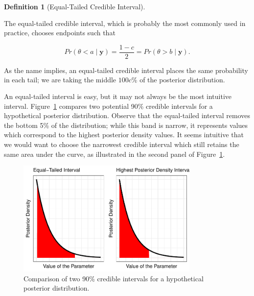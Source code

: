 \documentclass[
  letterpaper,
  DIV=11,
  numbers=noendperiod]{scrreprt}
\theoremstyle{definition}
\newtheorem{definition}{Definition}[chapter]
\theoremstyle{plain}
\theoremstyle{definition}
\theoremstyle{remark}
\begin{document}
\begin{definition}[Equal-Tailed Credible
Interval]\protect\hypertarget{def-equal-tail-interval}{}\label{def-equal-tail-interval}

The equal-tailed credible interval, which is probably the most commonly
used in practice, chooses endpoints such that

\[Pr(\theta < a \mid \mathbf{y}) = \frac{1-c}{2} = Pr(\theta > b \mid \mathbf{y}).\]

\end{definition}

As the name implies, an equal-tailed credible interval places the same
probability in each tail; we are taking the middle \(100c\)\% of the
posterior distribution.

An equal-tailed interval is easy, but it may not always be the most
intuitive interval.
Figure~\ref{fig-interval-estimation-compare-intervals} compares two
potential 90\% credible intervals for a hypothetical posterior
distribution. Observe that the equal-tailed interval removes the bottom
5\% of the distribution; while this band is narrow, it represents values
which correspond to the highest posterior density values. It seems
intuitive that we would want to choose the narrowest credible interval
which still retains the same area under the curve, as illustrated in the
second panel of Figure~\ref{fig-interval-estimation-compare-intervals}.

\begin{figure}

{\centering \includegraphics[width=0.8\textwidth,height=\textheight]{./images/fig-interval-estimation-compare-intervals-1.pdf}

}

\caption{\label{fig-interval-estimation-compare-intervals}Comparison of
two 90\% credible intervals for a hypothetical posterior distribution.}

\end{figure}
\end{document}
